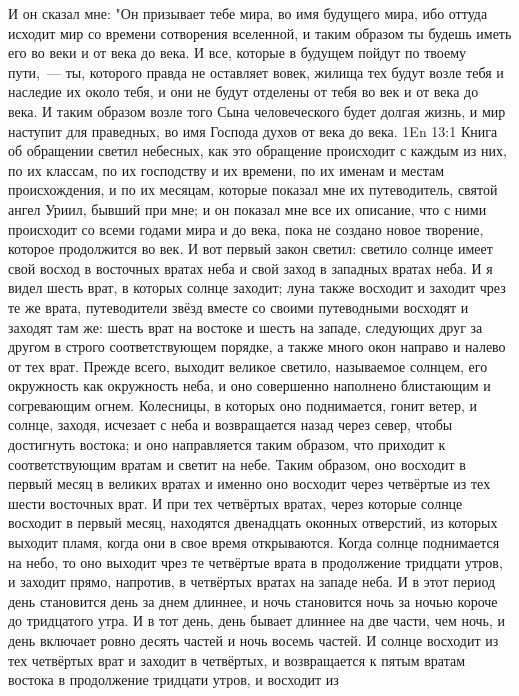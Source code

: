 И он сказал мне: "Он призывает тебе мира, во имя будущего мира, ибо
оттуда исходит мир со времени сотворения вселенной, и таким образом ты будешь
иметь его во веки и от века до века.
И все, которые в будущем пойдут по твоему пути,~--- ты, которого правда
не оставляет вовек, жилища тех будут возле тебя и наследие их около тебя, и они
не будут отделены от тебя во век и от века до века.
И таким образом возле того Сына человеческого будет долгая жизнь, и
мир наступит для праведных, во имя Господа духов от века до века.
\vs 1En 13:1
Книга об обращении светил небесных, как это обращение происходит
с каждым из них, по их классам, по их господству и их времени, по их именам и
местам происхождения, и по их месяцам, которые показал мне их путеводитель,
святой ангел Уриил, бывший при мне; и он показал мне все их описание, что с
ними происходит со всеми годами мира и до века, пока не создано новое творение,
которое продолжится во век.
И вот первый закон светил: светило солнце имеет свой восход в восточных
вратах неба и свой заход в западных вратах неба.
И я видел шесть врат, в которых солнце заходит; луна также восходит и
заходит чрез те же врата, путеводители звёзд вместе со своими путеводными
восходят и заходят там же: шесть врат на востоке и шесть на западе, следующих
друг за другом в строго соответствующем порядке, а также много окон направо и
налево от тех врат.
Прежде всего, выходит великое светило, называемое солнцем, его
окружность как окружность неба, и оно совершенно наполнено блистающим и
согревающим огнем.
Колесницы, в которых оно поднимается, гонит ветер, и солнце, заходя,
исчезает с неба и возвращается назад через север, чтобы достигнуть востока; и
оно направляется таким образом, что приходит к соответствующим вратам и светит
на небе.
Таким образом, оно восходит в первый месяц в великих вратах и
именно оно восходит через четвёртые из тех шести восточных врат.
И при тех четвёртых вратах, через которые солнце восходит в первый
месяц, находятся двенадцать оконных отверстий, из которых выходит пламя, когда
они в свое время открываются.
Когда солнце поднимается на небо, то оно выходит чрез те четвёртые
врата в продолжение тридцати утров, и заходит прямо, напротив, в четвёртых
вратах на западе неба.
И в этот период день становится день за днем длиннее, и ночь становится
ночь за ночью короче до тридцатого утра.
И в тот день, день бывает длиннее на две части, чем ночь, и день
включает ровно десять частей и ночь восемь частей.
И солнце восходит из тех четвёртых врат и заходит в четвёртых, и
возвращается к пятым вратам востока в продолжение тридцати утров, и восходит из
